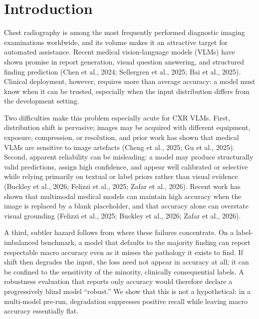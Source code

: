 \section{Introduction}

Chest radiography is among the most frequently performed diagnostic imaging examinations worldwide, and its volume makes it an attractive target for automated assistance. Recent medical vision-language models (VLMs) have shown promise in report generation, visual question answering, and structured finding prediction (Chen et al., 2024; Sellergren et al., 2025; Bai et al., 2025). Clinical deployment, however, requires more than average accuracy: a model must know when it can be trusted, especially when the input distribution differs from the development setting.

Two difficulties make this problem especially acute for CXR VLMs. First, distribution shift is pervasive; images may be acquired with different equipment, exposure, compression, or resolution, and prior work has shown that medical VLMs are sensitive to image artefacts (Cheng et al., 2025; Gu et al., 2025). Second, apparent reliability can be misleading: a model may produce structurally valid predictions, assign high confidence, and appear well calibrated or selective while relying primarily on textual or label priors rather than visual evidence (Buckley et al., 2026; Felizzi et al., 2025; Zafar et al., 2026). Recent work has shown that multimodal medical models can maintain high accuracy when the image is replaced by a blank placeholder, and that accuracy alone can overstate visual grounding (Felizzi et al., 2025; Buckley et al., 2026; Zafar et al., 2026).

A third, subtler hazard follows from where these failures concentrate. On a label-imbalanced benchmark, a model that defaults to the majority finding can report respectable macro accuracy even as it misses the pathology it exists to find. If shift then degrades the input, the loss need not appear in accuracy at all; it can be confined to the sensitivity of the minority, clinically consequential labels. A robustness evaluation that reports only accuracy would therefore declare a progressively blind model ``robust.'' We show that this is not a hypothetical: in a multi-model pre-run, degradation suppresses positive recall while leaving macro accuracy essentially flat.


